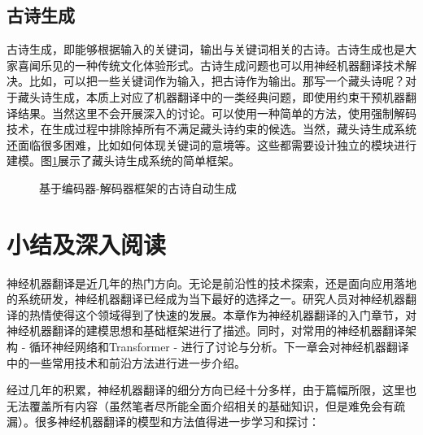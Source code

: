 
\subsection{古诗生成}

\parinterval 古诗生成，即能够根据输入的关键词，输出与关键词相关的古诗。古诗生成也是大家喜闻乐见的一种传统文化体验形式。古诗生成问题也可以用神经机器翻译技术解决。比如，可以把一些关键词作为输入，把古诗作为输出。那写一个藏头诗呢？对于藏头诗生成，本质上对应了机器翻译中的一类经典问题，即使用约束干预机器翻译结果。当然这里不会开展深入的讨论。可以使用一种简单的方法，使用强制解码技术，在生成过程中排除掉所有不满足藏头诗约束的候选。当然，藏头诗生成系统还面临很多困难，比如如何体现关键词的意境等。这些都需要设计独立的模块进行建模。图\ref{fig:6-60}展示了藏头诗生成系统的简单框架。

\begin{figure}[htp]
    \centering

    \caption{基于编码器-解码器框架的古诗自动生成}
    \label{fig:6-60}
\end{figure}


\sectionnewpage
\section{小结及深入阅读}

\parinterval 神经机器翻译是近几年的热门方向。无论是前沿性的技术探索，还是面向应用落地的系统研发，神经机器翻译已经成为当下最好的选择之一。研究人员对神经机器翻译的热情使得这个领域得到了快速的发展。本章作为神经机器翻译的入门章节，对神经机器翻译的建模思想和基础框架进行了描述。同时，对常用的神经机器翻译架构 - 循环神经网络和Transformer - 进行了讨论与分析。下一章会对神经机器翻译中的一些常用技术和前沿方法进行进一步介绍。

\parinterval 经过几年的积累，神经机器翻译的细分方向已经十分多样，由于篇幅所限，这里也无法覆盖所有内容（虽然笔者尽所能全面介绍相关的基础知识，但是难免会有疏漏）。很多神经机器翻译的模型和方法值得进一步学习和探讨：

